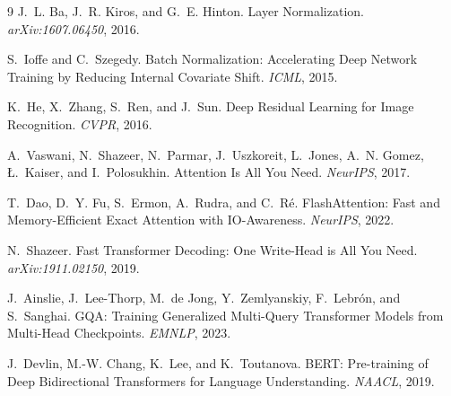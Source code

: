 \documentclass[11pt]{article}
\begin{document}
\begin{thebibliography}{9}
J.~L. Ba, J.~R. Kiros, and G.~E. Hinton.
Layer Normalization.
\emph{arXiv:1607.06450}, 2016.

S.~Ioffe and C.~Szegedy.
Batch Normalization: Accelerating Deep Network Training by Reducing
Internal Covariate Shift.
\emph{ICML}, 2015.

K.~He, X.~Zhang, S.~Ren, and J.~Sun.
Deep Residual Learning for Image Recognition.
\emph{CVPR}, 2016.

A.~Vaswani, N.~Shazeer, N.~Parmar, J.~Uszkoreit, L.~Jones, A.~N. Gomez,
\L.~Kaiser, and I.~Polosukhin.
Attention Is All You Need.
\emph{NeurIPS}, 2017.

T.~Dao, D.~Y. Fu, S.~Ermon, A.~Rudra, and C.~R\'{e}.
FlashAttention: Fast and Memory-Efficient Exact Attention with IO-Awareness.
\emph{NeurIPS}, 2022.

N.~Shazeer.
Fast Transformer Decoding: One Write-Head is All You Need.
\emph{arXiv:1911.02150}, 2019.

J.~Ainslie, J.~Lee-Thorp, M.~de Jong, Y.~Zemlyanskiy, F.~Lebr\'{o}n,
and S.~Sanghai.
GQA: Training Generalized Multi-Query Transformer Models from Multi-Head
Checkpoints.
\emph{EMNLP}, 2023.

J.~Devlin, M.-W. Chang, K.~Lee, and K.~Toutanova.
BERT: Pre-training of Deep Bidirectional Transformers for Language
Understanding.
\emph{NAACL}, 2019.
\end{thebibliography}
\end{document}
